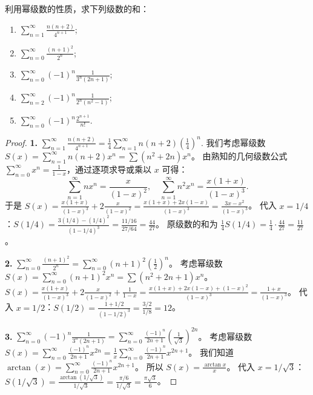 \documentclass[lang=cn,10pt,thmcnt=section]{elegantbook}
\begin{document}
	\begin{example}
		利用幂级数的性质，求下列级数的和：
		\begin{enumerate}
			\item $\sum_{n=1}^{\infty} \frac{n(n+2)}{4^{n+1}}$;
			\item $\sum_{n=0}^{\infty} \frac{(n+1)^2}{2^n}$;
			\item $\sum_{n=0}^{\infty} (-1)^n \frac{1}{3^n (2n+1)}$;
			\item $\sum_{n=2}^{\infty} (-1)^n \frac{1}{2^n (n^2 - 1)}$;
			\item $\sum_{n=0}^{\infty} (-1)^n \frac{2^{n+1}}{n!}$.
		\end{enumerate}
	\end{example}
	\begin{proof}
		\textbf{1. } $\sum_{n=1}^{\infty} \frac{n(n+2)}{4^{n+1}} = \frac{1}{4} \sum_{n=1}^{\infty} n(n+2) \left(\frac{1}{4}\right)^n$.
		我们考虑幂级数 $S(x) = \sum_{n=1}^\infty n(n+2)x^n = \sum (n^2+2n)x^n$。
		由熟知的几何级数公式 $\sum_{n=0}^\infty x^n = \frac{1}{1-x}$，通过逐项求导或乘以 $x$ 可得：
		\[ \sum_{n=1}^\infty nx^n = \frac{x}{(1-x)^2}, \quad \sum_{n=1}^\infty n^2 x^n = \frac{x(1+x)}{(1-x)^3}. \]
		于是 $S(x) = \frac{x(1+x)}{(1-x)^3} + 2 \frac{x}{(1-x)^2} = \frac{x(1+x)+2x(1-x)}{(1-x)^3} = \frac{3x-x^2}{(1-x)^3}$。
		代入 $x=1/4$：$S(1/4) = \frac{3(1/4)-(1/4)^2}{(1-1/4)^3} = \frac{11/16}{27/64} = \frac{44}{27}$。
		原级数的和为 $\frac{1}{4} S(1/4) = \frac{1}{4} \cdot \frac{44}{27} = \frac{11}{27}$。
	
		\textbf{2. } $\sum_{n=0}^{\infty} \frac{(n+1)^2}{2^n} = \sum_{n=0}^{\infty} (n+1)^2 \left(\frac{1}{2}\right)^n$。
		考虑幂级数 $S(x) = \sum_{n=0}^\infty (n+1)^2 x^n = \sum (n^2+2n+1)x^n$。
		$S(x) = \frac{x(1+x)}{(1-x)^3} + 2\frac{x}{(1-x)^2} + \frac{1}{1-x} = \frac{x(1+x)+2x(1-x)+(1-x)^2}{(1-x)^3} = \frac{1+x}{(1-x)^3}$。
		代入 $x=1/2$：$S(1/2) = \frac{1+1/2}{(1-1/2)^3} = \frac{3/2}{1/8} = 12$。
	
		\textbf{3. } $\sum_{n=0}^{\infty} (-1)^n \frac{1}{3^n (2n+1)} = \sum_{n=0}^{\infty} \frac{(-1)^n}{2n+1} \left(\frac{1}{\sqrt{3}}\right)^{2n}$。
		考虑幂级数 $S(x) = \sum_{n=0}^\infty \frac{(-1)^n}{2n+1} x^{2n} = \frac{1}{x} \sum_{n=0}^\infty \frac{(-1)^n}{2n+1} x^{2n+1}$。
		我们知道 $\arctan(x) = \sum_{n=0}^\infty \frac{(-1)^n}{2n+1} x^{2n+1}$。
		所以 $S(x) = \frac{\arctan x}{x}$。
		代入 $x=1/\sqrt{3}$：$S(1/\sqrt{3}) = \frac{\arctan(1/\sqrt{3})}{1/\sqrt{3}} = \frac{\pi/6}{1/\sqrt{3}} = \frac{\pi\sqrt{3}}{6}$。
		

\end{proof}
\end{document}
